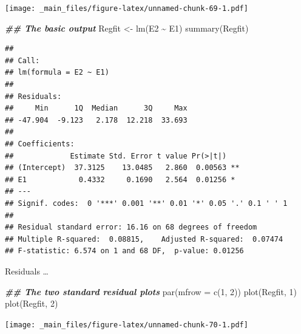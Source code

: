 \documentclass[
]{book}
\newenvironment{Shaded}{\begin{snugshade}}{\end{snugshade}}
\newcommand{\AttributeTok}[1]{\textcolor[rgb]{0.77,0.63,0.00}{#1}}
\newcommand{\DecValTok}[1]{\textcolor[rgb]{0.00,0.00,0.81}{#1}}
\newcommand{\DocumentationTok}[1]{\textcolor[rgb]{0.56,0.35,0.01}{\textbf{\textit{#1}}}}
\newcommand{\FunctionTok}[1]{\textcolor[rgb]{0.00,0.00,0.00}{#1}}
\newcommand{\NormalTok}[1]{#1}
\newcommand{\OtherTok}[1]{\textcolor[rgb]{0.56,0.35,0.01}{#1}}
\newcommand{\SpecialCharTok}[1]{\textcolor[rgb]{0.00,0.00,0.00}{#1}}
\begin{document}
\texttt{[image: \_main\_files/figure-latex/unnamed-chunk-69-1.pdf]}

\begin{Shaded}
\begin{Highlighting}[]
\DocumentationTok{\#\# The basic output}
\NormalTok{Regfit }\OtherTok{\textless{}{-}} \FunctionTok{lm}\NormalTok{(E2 }\SpecialCharTok{\textasciitilde{}}\NormalTok{ E1)}
\FunctionTok{summary}\NormalTok{(Regfit)}
\end{Highlighting}
\end{Shaded}

\begin{verbatim}
## 
## Call:
## lm(formula = E2 ~ E1)
## 
## Residuals:
##     Min      1Q  Median      3Q     Max 
## -47.904  -9.123   2.178  12.218  33.693 
## 
## Coefficients:
##             Estimate Std. Error t value Pr(>|t|)   
## (Intercept)  37.3125    13.0485   2.860  0.00563 **
## E1            0.4332     0.1690   2.564  0.01256 * 
## ---
## Signif. codes:  0 '***' 0.001 '**' 0.01 '*' 0.05 '.' 0.1 ' ' 1
## 
## Residual standard error: 16.16 on 68 degrees of freedom
## Multiple R-squared:  0.08815,    Adjusted R-squared:  0.07474 
## F-statistic: 6.574 on 1 and 68 DF,  p-value: 0.01256
\end{verbatim}

Residuals \ldots{}

\begin{Shaded}
\begin{Highlighting}[]
\DocumentationTok{\#\# The two standard residual plots}
\FunctionTok{par}\NormalTok{(}\AttributeTok{mfrow =} \FunctionTok{c}\NormalTok{(}\DecValTok{1}\NormalTok{, }\DecValTok{2}\NormalTok{))}
\FunctionTok{plot}\NormalTok{(Regfit, }\DecValTok{1}\NormalTok{)}
\FunctionTok{plot}\NormalTok{(Regfit, }\DecValTok{2}\NormalTok{)}
\end{Highlighting}
\end{Shaded}

\texttt{[image: \_main\_files/figure-latex/unnamed-chunk-70-1.pdf]}
\end{document}
